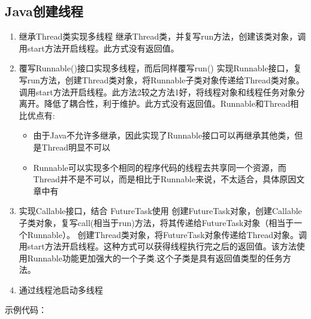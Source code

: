 \documentclass[../../../interview-questions.tex]{subfiles}
\begin{document}
\subsection{Java创建线程}

\begin{enumerate}
    \item{继承Thread类实现多线程} 继承Thread类，并复写run方法，创建该类对象，调用start方法开启线程。此方式没有返回值。
    \item{覆写Runnable()接口实现多线程，而后同样覆写run()} 实现Runnable接口，复写run方法，创建Thread类对象，将Runnable子类对象传递给Thread类对象。调用start方法开启线程。此方法2较之方法1好，将线程对象和线程任务对象分离开。降低了耦合性，利于维护。此方式没有返回值。Runnable和Thread相比优点有:
    
    \begin{itemize}
        \item {由于Java不允许多继承，因此实现了Runnable接口可以再继承其他类，但是Thread明显不可以}
        \item {Runnable可以实现多个相同的程序代码的线程去共享同一个资源，而Thread并不是不可以，而是相比于Runnable来说，不太适合，具体原因文章中有}
    \end{itemize}

    \item{实现Callable接口，结合 FutureTask使用} 创建FutureTask对象，创建Callable子类对象，复写call(相当于run)方法，将其传递给FutureTask对象（相当于一个Runnable）。 创建Thread类对象，将FutureTask对象传递给Thread对象。调用start方法开启线程。这种方式可以获得线程执行完之后的返回值。该方法使用Runnable功能更加强大的一个子类.这个子类是具有返回值类型的任务方法。
    \item {通过线程池启动多线程}
\end{enumerate}

示例代码：
\end{document}
